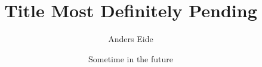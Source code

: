 \author{Anders Eide}
\title{Title Most Definitely Pending}
\date{Sometime in the future}

\maketitle


\newpage
\tableofcontents

